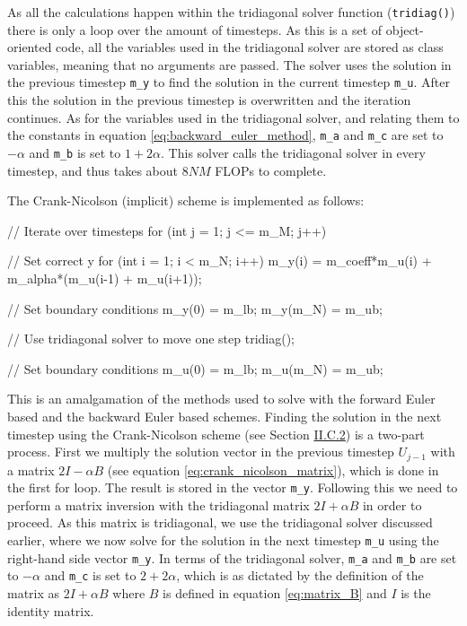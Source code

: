 \documentclass[reprint,english,notitlepage]{revtex4-1}  %
\begin{document}
As all the calculations happen within the tridiagonal solver function (\verb+tridiag()+) there is only a loop over the amount of timesteps. As this is a set of object-oriented code, all the variables used in the tridiagonal solver are stored as class variables, meaning that no arguments are passed. The solver uses the solution in the previous timestep \verb+m_y+ to find the solution in the current timestep \verb+m_u+. After this the solution in the previous timestep is overwritten and the iteration continues. As for the variables used in the tridiagonal solver, and relating them to the constants in equation \eqref{eq:backward_euler_method}, \verb+m_a+ and \verb+m_c+ are set to $-\alpha$ and \verb+m_b+ is set to $1 + 2\alpha$. This solver calls the tridiagonal solver in every timestep, and thus takes about $8NM$ FLOPs to complete.

The Crank-Nicolson (implicit) scheme is implemented as follows:

\begin{cpp}
// Iterate over timesteps
for (int j = 1; j <= m_M; j++){
  // Set correct y
  for (int i = 1; i < m_N; i++){
    m_y(i) = m_coeff*m_u(i) + m_alpha*(m_u(i-1) + m_u(i+1));
  }

  // Set boundary conditions
  m_y(0) = m_lb;
  m_y(m_N) = m_ub;

  // Use tridiagonal solver to move one step
  tridiag();

  // Set boundary conditions
  m_u(0) = m_lb;
  m_u(m_N) = m_ub;
}
\end{cpp}

This is an amalgamation of the methods used to solve with the forward Euler based and the backward Euler based schemes. Finding the solution in the next timestep using the Crank-Nicolson scheme (see Section \hyperref[sec:formalism_crank_nicolson]{II.C.2}) is a two-part process. First we multiply the solution vector in the previous timestep $U_{j-1}$ with a matrix $2I - \alpha B$ (see equation \eqref{eq:crank_nicolson_matrix}), which is done in the first for loop. The result is stored in the vector \verb+m_y+. Following this we need to perform a matrix inversion with the tridiagonal matrix $2I + \alpha B$ in order to proceed. As this matrix is tridiagonal, we use the tridiagonal solver discussed earlier, where we now solve for the solution in the next timestep \verb+m_u+ using the right-hand side vector \verb+m_y+. In terms of the tridiagonal solver, \verb+m_a+ and \verb+m_b+ are set to $-\alpha$ and \verb+m_c+ is set to $2 + 2\alpha$, which is as dictated by the definition of the matrix as $2I + \alpha B$ where $B$ is defined in equation \eqref{eq:matrix_B} and $I$ is the identity matrix. 
\end{document}
